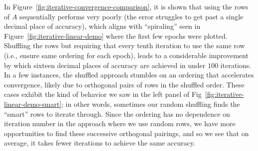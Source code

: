 In Figure~\ref{fig:iterative-convergence-comparison}, it is shown that using the rows of $A$ sequentially performs very poorly (the error struggles to get past a single decimal place of accuracy), which aligns with ``spiraling'' seen in Figure~\ref{fig:iterative-linear-demo} where the first few epochs were plotted.
Shuffling the rows but requiring that every tenth iteration to use the same row (i.e., ensure same ordering for each epoch), leads to a considerable improvement by which sixteen decimal places of accuracy are achieved in under $100$ iterations.
In a few instances, the shuffled approach stumbles on an ordering that accelerates convergence, likely due to orthogonal pairs of rows in the shuffled order.
These cases exhibit the kind of behavior we saw in the left panel of Fig~\ref{fig:iterative-linear-demo-smart}; in other words, sometimes our random shuffling finds the ``smart'' rows to iterate through.
Since the ordering has no dependence on iteration number in the approach where we use random rows, we have more opportunities to find these successive orthogonal pairings, and so we see that on average, it takes fewer iterations to achieve the same accuracy.

%
%
%
